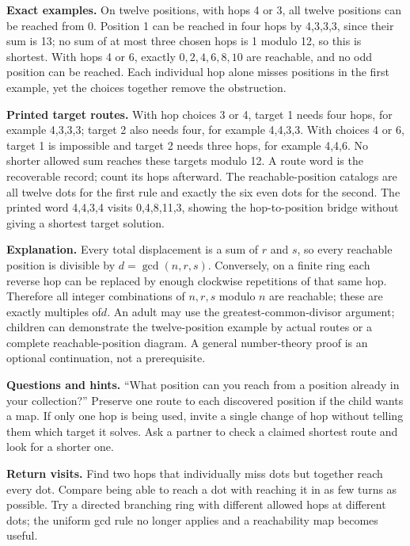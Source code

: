 \textbf{Exact examples.} On twelve positions, with hops 4 or 3, all twelve positions can be reached from 0. Position 1 can be reached in four hops by 4,3,3,3, since their sum is 13; no sum of at most three chosen hops is 1 modulo 12, so this is shortest. With hops 4 or 6, exactly $0,2,4,6,8,10$ are reachable, and no odd position can be reached. Each individual hop alone misses positions in the first example, yet the choices together remove the obstruction.

\textbf{Printed target routes.} With hop choices 3 or 4, target 1 needs four hops, for example 4,3,3,3; target 2 also needs four, for example 4,4,3,3. With choices 4 or 6, target 1 is impossible and target 2 needs three hops, for example 4,4,6. No shorter allowed sum reaches these targets modulo 12. A route word is the recoverable record; count its hops afterward. The reachable-position catalogs are all twelve dots for the first rule and exactly the six even dots for the second. The printed word 4,4,3,4 visits 0,4,8,11,3, showing the hop-to-position bridge without giving a shortest target solution.

\textbf{Explanation.} Every total displacement is a sum of $r$ and $s$, so every reachable position is divisible by $d=\gcd(n,r,s)$. Conversely, on a finite ring each reverse hop can be replaced by enough clockwise repetitions of that same hop. Therefore all integer combinations of $n,r,s$ modulo $n$ are reachable; these are exactly multiples of$d$. An adult may use the greatest-common-divisor argument; children can demonstrate the twelve-position example by actual routes or a complete reachable-position diagram. A general number-theory proof is an optional continuation, not a prerequisite.

\textbf{Questions and hints.} ``What position can you reach from a position already in your collection?'' Preserve one route to each discovered position if the child wants a map. If only one hop is being used, invite a single change of hop without telling them which target it solves. Ask a partner to check a claimed shortest route and look for a shorter one.

\textbf{Return visits.} Find two hops that individually miss dots but together reach every dot. Compare being able to reach a dot with reaching it in as few turns as possible. Try a directed branching ring with different allowed hops at different dots; the uniform gcd rule no longer applies and a reachability map becomes useful.

